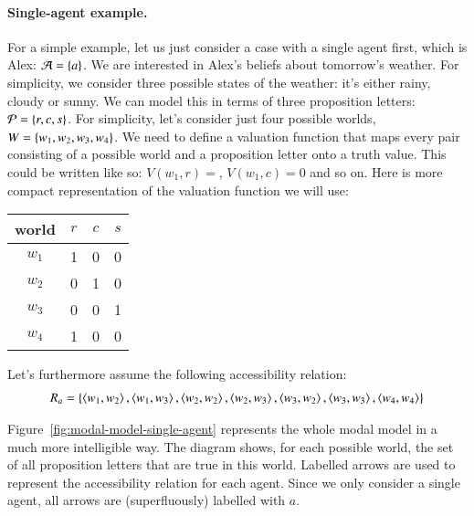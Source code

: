 \documentclass[nobib,nofonts]{tufte-handout}
\begin{document}
\paragraph{Single-agent example.}
For a simple example, let us just consider a case with a single agent first, which is Alex: $\mathcal{A} = \left\{a\right\}$.
We are interested in Alex's beliefs about tomorrow's weather.
For simplicity, we consider three possible states of the weather: it's either rainy, cloudy or sunny.
We can model this in terms of three proposition letters: $\mathcal{P} = \left\{r, c, s\right\}$.
For simplicity, let's consider just four possible worlds, $W = \left\{w_{1}, w_{2}, w_{3}, w_{4}\right\}$.
We need to define a valuation function that maps every pair consisting of a possible world and a proposition letter onto a truth value.
This could be written like so: $V(w_{1},r) =$, $V(w_{1},c) = 0$ and so on.
Here is more compact representation of the valuation function we will use:
\begin{center}
  \begin{tabular}{cccc}
    world & $r$ & $c$ & $s$ \\ \hline
    $w_{1}$ & 1 & 0 & 0 \\
    $w_{2}$ & 0 & 1 & 0 \\
    $w_{3}$ & 0 & 0 & 1 \\
    $w_{4}$ & 1 & 0 & 0 \\
  \end{tabular}
\end{center}
Let's furthermore assume the following accessibility relation:
\begin{align*}
  R_{a} = \left\{
  \left \langle w_{1}, w_{2}\right\rangle, \left \langle w_{1}, w_{3}\right\rangle,
  \left \langle w_{2}, w_{2}\right\rangle, \left \langle w_{2}, w_{3}\right\rangle,
  \left \langle w_{3}, w_{2}\right\rangle, \left \langle w_{3}, w_{3}\right\rangle,
  \left \langle w_{4}, w_{4}\right\rangle
  \right\}
\end{align*}

Figure~\ref{fig:modal-model-single-agent} represents the whole modal model in a much more intelligible way.
The diagram shows, for each possible world, the set of all proposition letters that are true in this world.
Labelled arrows are used to represent the accessibility relation for each agent.
Since we only consider a single agent, all arrows are (superfluously) labelled with $a$.
\end{document}
